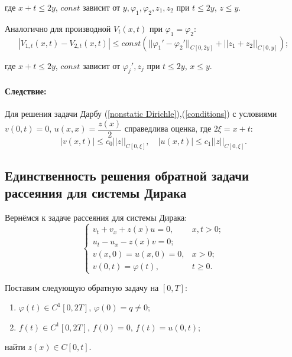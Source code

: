 \documentclass{article}
\newenvironment{hence}{ \paragraph{Следствие:}}{}
\begin{document}
где $x+t \leqslant 2y$, $const$ зависит от $y, \varphi_1, \varphi_2, z_1, z_2$ при $t\leqslant 2y$, $z\leqslant y$.

Аналогично для производной $V_t(x,t)$ при $\varphi_1 = \varphi_2$:
\begin{equation*}
	|V_{1,t} (x,t) - V_{2,t}(x,t)| \leqslant 
	const(||\varphi_1' - \varphi_2'||_{C[0,2y]} + ||z_1 + z_2||_{C[0,y]});
\end{equation*}

где $x + t \leqslant 2y$, $const$ зависит от $\varphi_j', z_j$ при $t \leqslant 2y$, $x\leqslant y$.

\begin{hence}
Для решения задачи Дарбу (\ref{nonstatic Dirichle}),(\ref{conditions}) с условиями $v(0,t) = 0$, $u(x,x) = \dfrac{z(x)}{2}$ справедлива оценка, где $2\xi = x + t$:
\begin{equation*}
	|v(x,t)| \leqslant c_0 ||z||_{C[0,\xi]}, \quad
	|u(x,t)| \leqslant c_1 ||z||_{C[0,\xi]}.
\end{equation*}
\end{hence}

\subsection*{Единственность решения обратной задачи рассеяния для системы Дирака}

Вернёмся к задаче рассеяния для системы Дирака:
\begin{equation}
\begin{cases}
	v_t + v_x + z(x) u = 0, & x,t>0;\\
	u_t - u_x - z(x) v = 0;\\
	v(x,0) = u(x,0) = 0, & x > 0;\\
	v(0,t) = \varphi(t), & t \geqslant 0.
\end{cases}
\label{Dirak system}
\end{equation}

Поставим следующую обратную задачу на $[0,T]$:
\begin{enumerate}
\item $\varphi(t) \in C^1[0,2T]$, $\varphi(0) = q \neq 0$;
\item $f(t) \in C^1[0,2T]$, $f(0) = 0$, $ f(t) = u(0,t)$;
\end{enumerate}
найти $z(x) \in C[0,t]$.
\end{document}
